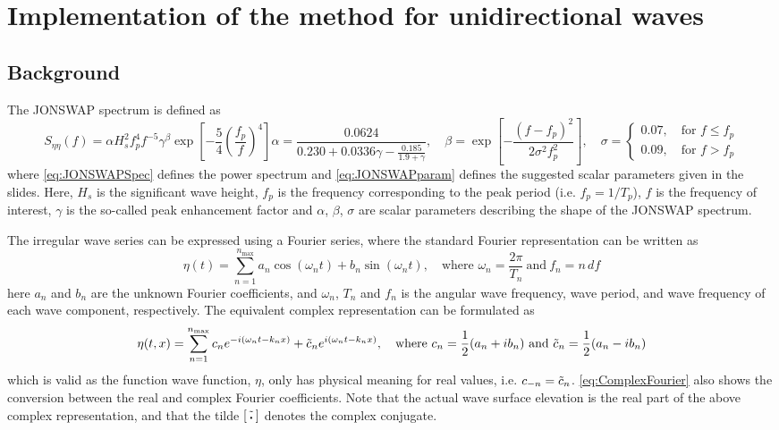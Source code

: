 \chapter{Implementation of the method for unidirectional waves}

\section{Background}
The JONSWAP spectrum is defined as
\begin{subequations}
\begin{equation}
    S_{\eta \eta}(f) = \alpha H_s^2 f_p^4 f^{-5} \gamma^\beta \exp{\left[-\frac{5}{4}\left(\frac{f_p}{f}\right)^4\right]}
    \label{eq:JONSWAPSpec}
\end{equation} 
\begin{equation}
    \alpha =\frac{0.0624}{0.230+0.0336\gamma-\frac{0.185}{1.9+\gamma}} ,\quad \beta = \exp{\left[ -\frac{(f-f_p)^2}{2\sigma^2f_p^2} \right]}, \quad
    \sigma =
    \begin{cases}
    0.07, \quad \text{for }f\leq f_p \\
    0.09, \quad \text{for }f> f_p
    \end{cases}
    \label{eq:JONSWAPparam}
\end{equation}
\label{eq:JONSWAP}
\end{subequations}
where \cref{eq:JONSWAPSpec} defines the power spectrum and \cref{eq:JONSWAPparam} defines the suggested scalar parameters given in the slides. Here, $H_s$ is the significant wave height, $f_p$ is the frequency corresponding to the peak period (i.e. $f_p=1/T_p$), $f$ is the frequency of interest, $\gamma$ is the so-called peak enhancement factor and $\alpha$, $\beta$, $\sigma$ are scalar parameters describing the shape of the JONSWAP spectrum. 

The irregular wave series can be expressed using a Fourier series, where the standard Fourier representation can be written as
\begin{equation}
    \eta(t) = \sum_{n=1}^{n_{\text{max}}} a_n \cos{(\omega_n t)} +b_n \sin{(\omega_n t)}, \quad \text{where }\omega_n=\frac{2\pi}{T_n} \  \text{and} \ f_n=n\,df
\end{equation}
here $a_n$ and $b_n$ are the unknown Fourier coefficients, and $\omega_n$, $T_n$ and $f_n$ is the angular wave frequency, wave period, and wave frequency of each wave component, respectively. The equivalent complex representation can be formulated as
\begin{equation}
    \eta(t,x) = \sum_{n=1}^{n_{\text{max}}} c_n e^{-i(\omega_n t-k_n x)} + \Tilde{c}_n e^{i(\omega_n t - k_n x)}, \quad \text{where }c_n=\frac{1}{2}(a_n+i b_n) \ \text{and} \ \Tilde{c}_n=\frac{1}{2}(a_n-i b_n)
    \label{eq:ComplexFourier}
\end{equation}
which is valid as the function wave function, $\eta$, only has physical meaning for real values, i.e. $c_{-n}=\Tilde{c}_n$. \cref{eq:ComplexFourier} also shows the conversion between the real and complex Fourier coefficients. Note that the actual wave surface elevation is the real part of the above complex representation, and that the tilde $[\, \Tilde{\text{\scalebox{0.5}{\textbullet}}}\,]$ denotes the complex conjugate.

